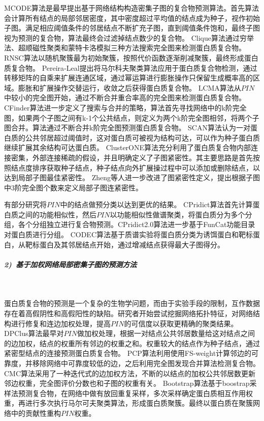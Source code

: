 MCODE算法\cite{bader_automated_2003}是最早提出基于网络结构构造密集子图的复合物预测算法。首先算法会计算所有结点的局部邻居密度，其中密度超过平均值的结点成为种子，视作初始子图。满足相应阈值条件的邻居结点不断扩充子图，直到阈值条件饱和，最终子图视为预测的复合物，算法最终会过滤掉结点数少的复合物。
Clique算法\cite{spirin_protein_2003}通过穷举法、超顺磁性聚类和蒙特卡洛模拟三种方法搜索完全图来检测蛋白质复合物。
RNSC算法\cite{king_protein_2004}以随机聚簇最为初始聚簇，按照代价函数逐渐削减聚簇，最终形成蛋白质复合物。
Pereira‐Leal\cite{pereiraleal_detection_2004}提出将马尔科夫聚类算法应用于蛋白质复合物检测，通过转移矩阵的自乘来扩展连通区域，通过幂运算进行膨胀操作只保留生成概率高的区域。膨胀和扩展操作交替运行，收敛之后获得蛋白质复合物。
LCMA算法\cite{li_interaction_2005}从$PIN$中较小的完全图开始，通过不断合并重合率高的完全图来检测蛋白质复合物。CFinder算法\cite{adamcsek_cfinder_2006}进一步定义了搜索与合并的策略，算法首先寻找网络中的k阶完全图，如果两个子图之间有k-1个公共结点，则定义为两个k阶完全图相邻，将两个子图合并。算法通过不断合并k阶完全图预测蛋白质复合物。
SCAN算法\cite{mete_structural_2008}认为一对蛋白质的公共邻居超过阈值时，这对蛋白质可被视为结构可达，可以作为种子蛋白质继续扩展其余结构可达蛋白质。
ClusterONE算法\cite{nepusz_detecting_2012}充分利用了蛋白质复合物内部连接密集，外部连接稀疏的假设，并且明确定义了子图紧密性。其主要思路是首先按照结点度排序获取种子结点，种子结点向外扩展操过程中可以添加或删除结点，以达到局部子图最佳紧密性。
Zheng等人\cite{zheng_protein_2020}进一步改进了图紧密性定义，提出根据子图中3阶完全图个数来定义局部子图连紧密性。

有部分研究将$PIN$中的结点做预分类以达到更优的结果。
CPridict算法\cite{xu_function_2014}首先计算蛋白质之间的功能相似性，然后$PIN$以功能相似性做谱聚类，将蛋白质分为多个分组，各个分组独立进行复合物预测。CPridict2.0算法\cite{xu_effective_2017}进一步基于FunCat功能目录对蛋白质进行分组。
CODEC算法\cite{geva_identification_2011}基于质谱实验将蛋白质分类为诱饵蛋白和靶标蛋白，从靶标蛋白及其邻居结点开始，通过增减结点获得最大子图得分。

\subparagraph*{2)~基于加权网络局部密集子图的预测方法} ~

蛋白质复合物的预测是一个复杂的生物学问题，而由于实验手段的限制，互作数据存在着高假阴性和高假阳性的缺陷\cite{von_mering_comparative_2002}。研究者开始尝试挖掘网络拓扑特征，对网络结构进行修复和连边加权处理，提高$PIN$的可信度以获取更精确的聚类结果。
DPClus算法\cite{altaf-ul-amin_development_2006}最早对$PIN$做加权处理，根据一对结点公共邻居数量给这对结点之间的边加权，结点的权重所有邻边的权重之和。权重较大的结点作为种子结点，通过紧密型结点的连接预测蛋白质复合物。
PCP算法\cite{chua_using_2008}利用使用FS-weight计算邻边的可靠度，并移除网络中可靠度较低的边，之后利用完全图发现合并算法检测复合物。
CMC算法\cite{liu_complex_2009}采用了一种迭代式的边加权方法，不断的以结点的加权公共邻居数更新邻边权重，完全图评价分数也和子图的权重有关。
Bootstrap算法\cite{friedel_bootstrapping_2009}基于boostrap采样法预测复合物，在网络中做有放回重复采样，多次采样确定蛋白质相互作用权重，再进行多次执行马尔可夫聚类算法，形成蛋白质聚簇。最终以蛋白质在聚簇网络中的贡献性重构$PIN$权重。

